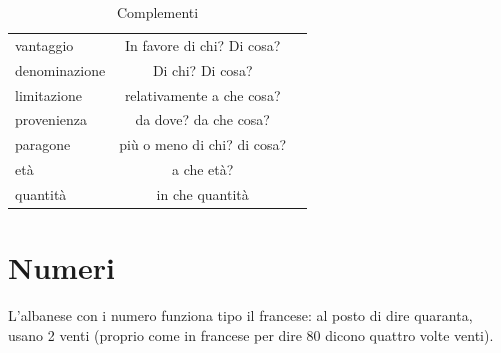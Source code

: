 \begin{table}[ht]
\begin{tabular}{lcr}
        vantaggio           & In favore di chi? Di cosa?    &\\
        denominazione       & Di chi? Di cosa?              &\\
        limitazione         & relativamente a che cosa?     &\\
        provenienza         & da dove? da che cosa?         &\\
        paragone            & più o meno di chi? di cosa?   &\\
        età                 & a che età?                    &\\
        quantità            & in che quantità               &\\
        \bottomrule
    \end{tabular}
    \caption{Complementi}
    \label{tbl:complementi}
\end{table}

\section{Numeri}

\begin{note}
    L'albanese con i numero funziona tipo il francese: al posto di dire quaranta, usano 2 venti (proprio come in francese per dire 80 dicono quattro volte venti).
\end{note}

